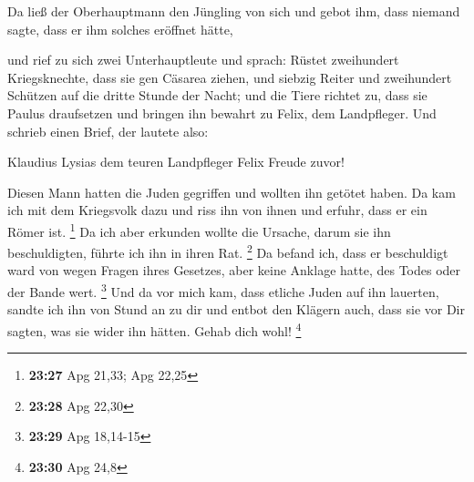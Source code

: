  Da ließ der Oberhauptmann den Jüngling von sich und
gebot ihm, dass niemand sagte, dass er ihm solches eröffnet hätte,

 und rief zu sich zwei Unterhauptleute und sprach: Rüstet
zweihundert Kriegsknechte, dass sie gen Cäsarea ziehen, und siebzig
Reiter und zweihundert Schützen auf die dritte Stunde der Nacht;
 und die Tiere richtet zu, dass sie Paulus draufsetzen
und bringen ihn bewahrt zu Felix, dem Landpfleger.  Und
schrieb einen Brief, der lautete also:

 Klaudius Lysias dem teuren Landpfleger Felix Freude
zuvor!

 Diesen Mann hatten die Juden gegriffen und wollten ihn
getötet haben. Da kam ich mit dem Kriegsvolk dazu und riss ihn von ihnen
und erfuhr, dass er ein Römer ist. \footnote{\textbf{23:27} Apg 21,33;
  Apg 22,25}  Da ich aber erkunden wollte die Ursache,
darum sie ihn beschuldigten, führte ich ihn in ihren Rat. \footnote{\textbf{23:28}
  Apg 22,30}  Da befand ich, dass er beschuldigt ward von
wegen Fragen ihres Gesetzes, aber keine Anklage hatte, des Todes oder
der Bande wert. \footnote{\textbf{23:29} Apg 18,14-15} 
Und da vor mich kam, dass etliche Juden auf ihn lauerten, sandte ich ihn
von Stund an zu dir und entbot den Klägern auch, dass sie vor Dir
sagten, was sie wider ihn hätten. Gehab dich wohl! \footnote{\textbf{23:30}
  Apg 24,8}

